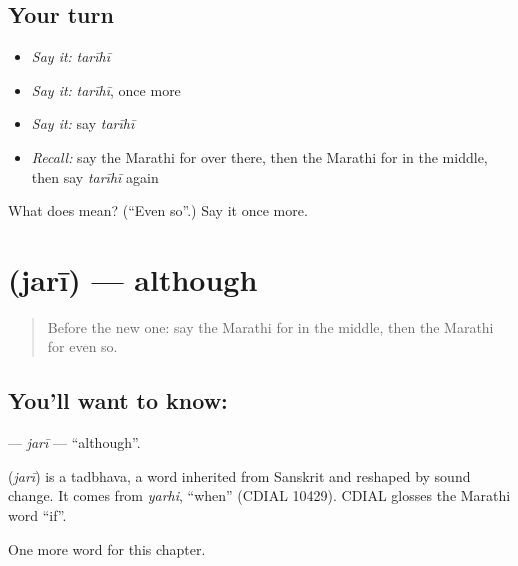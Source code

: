 \subsection*{Your turn}
\begin{itemize}
\raggedright
  \item \emph{Say it:} \emph{tarīhī}
  \item \emph{Say it:} \emph{tarīhī}, once more
  \item \emph{Say it:} say \emph{tarīhī}
  \item \emph{Recall:} say the Marathi for over there, then the Marathi for in the middle, then say \emph{tarīhī} again
\end{itemize}

\begin{tcolorbox}[breakable,colback=teal!4,colframe=teal!35!black,title={Before you move on}]
What does  mean? (\textquotedblleft{}Even so\textquotedblright{}.) Say it once more.
\end{tcolorbox}
\section[\texorpdfstring{\mr{जरी} (jarī)}{जरी (jarī)}]{ (jarī) — although}

\label{lesson:MR-C173-jari}



\begin{quote}
Before the new one: say the Marathi for in the middle, then the Marathi for even so.
\end{quote}

\subsection*{You'll want to know: }
\textbf{} — \emph{jarī} — \textquotedblleft{}although\textquotedblright{}.

\begin{cousinweb}
\textbf{} (\emph{jarī}) is a tadbhava, a word inherited from Sanskrit and reshaped by sound change. It comes from \emph{yarhi}, \textquotedblleft{}when\textquotedblright{} (CDIAL 10429). CDIAL glosses the Marathi word \textquotedblleft{}if\textquotedblright{}.
\end{cousinweb}

\begin{grammarlens}[title={What you've built}]
One more word for this chapter.
\end{grammarlens}

